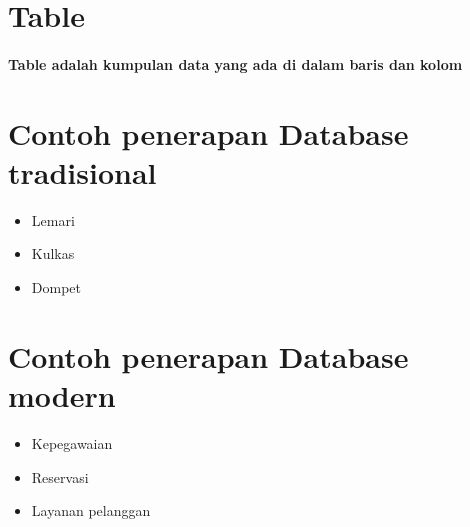 \documentclass[10pt]{article}
\begin{document}
\section*{Table}
\paragraph{Table adalah kumpulan data yang ada di dalam baris dan kolom}

\section*{Contoh penerapan Database tradisional}
 \begin{itemize}
  \item Lemari
  \item Kulkas
  \item Dompet
 \end{itemize}
 
 \newpage
 \section*{Contoh penerapan Database modern}
 \begin{itemize}
  \item Kepegawaian
  \item Reservasi
  \item Layanan pelanggan
 \end{itemize}
\end{document}

